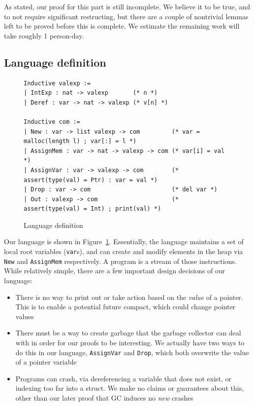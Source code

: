 \documentclass{article}
\begin{document}
As stated, our proof for this part is still incomplete. We believe it to be true, and to not require significant restructing, but there are a couple of nontrivial lemmas left to be proved before this is complete. We estimate the remaining work will take roughly 1 person-day.

\subsection{Language definition}
\begin{figure}[H]
    \centering
\begin{lstlisting}
Inductive valexp :=
| IntExp : nat -> valexp       (* n *)
| Deref : var -> nat -> valexp (* v[n] *)

Inductive com :=
| New : var -> list valexp -> com         (* var = malloc(length l) ; var[:] = l *)
| AssignMem : var -> nat -> valexp -> com (* var[i] = val *)
| AssignVar : var -> valexp -> com        (* assert(type(val) = Ptr) : var = val *)
| Drop : var -> com                       (* del var *)
| Out : valexp -> com                     (* assert(type(val) = Int) ; print(val) *)
\end{lstlisting}
    \caption{Language definition}
    \label{fig:language}
\end{figure}

Our language is shown in Figure~\ref{fig:language}. 
Essentially, the language maintains a set of local root variables (\lstinline|var|s), and can create and modify elements in the heap via \lstinline|New| and \lstinline|AssignMem| respectively.
A program is a stream of those instructions. While relatively simple, there are a few important design decisions of our language:

\begin{itemize}
\item There is no way to print out or take action based on the \emph{value} of a pointer. This is to enable a potential future compact, which could change pointer values
\item There must be a way to create garbage that the garbage collector can deal with in order for our proofs to be interesting. We actually have two ways to do this in our language, \lstinline|AssignVar| and \lstinline|Drop|, which both overwrite the value of a pointer variable
\item Programs can crash, via dereferencing a variable that does not exist, or indexing too far into a struct. We make no claims or guarantees about this, other than our later proof that GC induces no \emph{new} crashes
\end{itemize}
\end{document}
